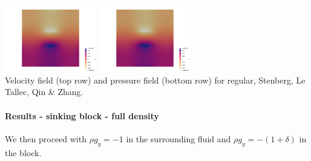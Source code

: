 \begin{center}
\includegraphics[width=4cm]{python_codes/fieldstone_78/results/block/reduced/p2}
\includegraphics[width=4cm]{python_codes/fieldstone_78/results/block/reduced/p3}\\
{\captionfont Velocity field (top row) and pressure field (bottom row) 
for regular, Stenberg, Le Tallec, Qin \& Zhang.} 
\end{center}


\paragraph{Results - sinking block - full density}

We then proceed with $\rho g_y=-1$ in the surrounding fluid and $\rho g_y=-(1+\delta)$ in the block.

